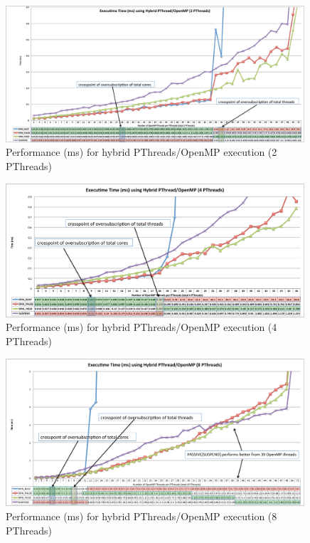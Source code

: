 \begin{figure}[h]
    \includegraphics[width=0.99\textwidth] {images/2PThread_performance}
    \caption{Performance (ms) for hybrid PThreads/OpenMP execution (2 PThreads)}
    \label{fig:2PThread_performance}
\end{figure}

\begin{figure}[h]
    \includegraphics[width=0.99\textwidth] {images/4PThread_performance}
    \caption{Performance (ms) for hybrid PThreads/OpenMP execution (4 PThreads)}
    \label{fig:4PThread_performance}
\end{figure}

\begin{figure}[h]
    \includegraphics[width=0.99\textwidth] {images/8PThread_performance}
    \caption{Performance (ms) for hybrid PThreads/OpenMP execution (8 PThreads)}
    \label{fig:8PThread_performance}
\end{figure}

